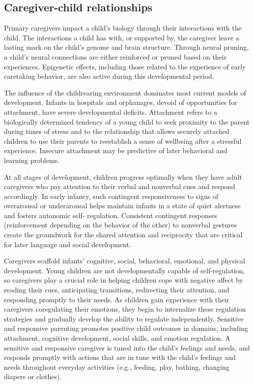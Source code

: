 \subsection{Caregiver-child relationships}
Primary caregivers impact a child’s biology through their interactions with the
child. The interactions a child has with, or supported by, the caregiver leave
a lasting mark on the child’s genome and brain structure. Through neural
pruning, a child’s neural connections are either reinforced or pruned based on
their experiences. Epigenetic effects, including those related to the
experience of early caretaking behavior, are also active during this
developmental period. \cite{Roth2011}

The influence of the childrearing environment dominates most current models of
development. Infants in hospitals and orphanages, devoid of opportunities for
attachment, have severe developmental deficits. Attachment refers to a
biologically determined tendency of a young child to seek proximity to the
parent during times of stress and to the relationship that allows securely
attached children to use their parents to reestablish a sense of wellbeing
after a stressful experience. Insecure attachment may be predictive of later
behavioral and learning problems. \cite{Nelson19}

At all stages of development, children progress optimally when they have adult
caregivers who pay attention to their verbal and nonverbal cues and respond
accordingly. In early infancy, such contingent responsiveness to signs of
overarousal or underarousal helps maintain infants in a state of quiet
alertness and fosters autonomic self-­ regulation. Consistent contingent
responses (reinforcement depending on the behavior of the other) to nonverbal
gestures create the groundwork for the shared attention and reciprocity that
are critical for later language and social development. \cite{Nelson19}

Caregivers scaffold infants’ cognitive, social, behavioral, emotional, and
physical development. Young children are not developmentally capable of
self-regulation, so caregivers play a crucial role in helping children cope
with negative affect by reading their cues, anticipating transitions,
redirecting their attention, and responding promptly to their needs. As
children gain experience with their caregivers coregulating their emotions,
they begin to internalize these regulation strategies and gradually develop the
ability to regulate independently. Sensitive and responsive parenting promotes
positive child outcomes in domains, including attachment, cognitive
development, social skills, and emotion regulation. A sensitive and responsive
caregiver is tuned into the child’s feelings and needs, and responds promptly
with actions that are in tune with the child’s feelings and needs throughout
everyday activities (e.g., feeding, play, bathing, changing diapers or
clothes). \cite{Feldman3}


